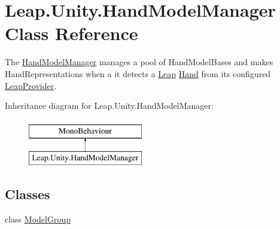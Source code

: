 \hypertarget{class_leap_1_1_unity_1_1_hand_model_manager}{}\section{Leap.\+Unity.\+Hand\+Model\+Manager Class Reference}
\label{class_leap_1_1_unity_1_1_hand_model_manager}


The \mbox{\hyperlink{class_leap_1_1_unity_1_1_hand_model_manager}{Hand\+Model\+Manager}} manages a pool of Hand\+Model\+Bases and makes Hand\+Representations when a it detects a \mbox{\hyperlink{namespace_leap_1_1_unity_1_1_leap}{Leap}} \mbox{\hyperlink{class_leap_1_1_hand}{Hand}} from its configured \mbox{\hyperlink{class_leap_1_1_unity_1_1_leap_provider}{Leap\+Provider}}.  


Inheritance diagram for Leap.\+Unity.\+Hand\+Model\+Manager\+:\begin{figure}[H]
\begin{center}
\leavevmode
\includegraphics[height=2.000000cm]{class_leap_1_1_unity_1_1_hand_model_manager}
\end{center}
\end{figure}
\subsection*{Classes}
\begin{DoxyCompactItemize}
\item 
class \mbox{\hyperlink{class_leap_1_1_unity_1_1_hand_model_manager_1_1_model_group}{Model\+Group}}
\end{DoxyCompactItemize}
